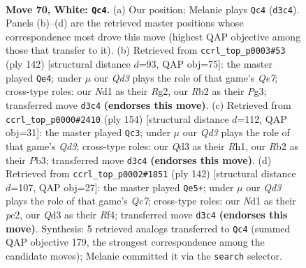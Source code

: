 \documentclass[11pt]{article}
\begin{document}
\clearpage

\begin{figure}[p]\centering
\begin{subfigure}{0.46\textwidth}\centering
\resizebox{\linewidth}{!}{%
\newchessgame
\chessboard[
  setfen={5r2/3qb1k1/5n2/P1p2p2/3p1Pp1/3Q4/1R1BPK2/3N4 w - - 0 70},
  showmover=false,
  pgfstyle=straightmove, color=movearrow, markmove={d3-c4}
]}
\caption{}
\end{subfigure}\hfill
\begin{subfigure}{0.46\textwidth}\centering
\resizebox{\linewidth}{!}{%
\newchessgame
\chessboard[
  setfen={5nk1/4Qpb1/3p2p1/3P3p/p4P2/q3B1PP/6RK/8 w - - 1 72},
  showmover=false,
  pgfstyle=straightmove, color=movearrow, markmove={e7-e4}
]}
\caption{}
\end{subfigure}
\\[4pt]
\begin{subfigure}{0.46\textwidth}\centering
\resizebox{\linewidth}{!}{%
\newchessgame
\chessboard[
  setfen={3q4/2r3k1/3p2pb/p1p1p3/P1B1P3/1P1Q2P1/6K1/7R w - - 8 78},
  showmover=false,
  pgfstyle=straightmove, color=movearrow, markmove={d3-c3}
]}
\caption{}
\end{subfigure}\hfill
\begin{subfigure}{0.46\textwidth}\centering
\resizebox{\linewidth}{!}{%
\newchessgame
\chessboard[
  setfen={6qk/2Q5/1p4pB/p1bb2Pp/P3pR1P/6K1/2p5/8 w - - 2 72},
  showmover=false,
  pgfstyle=straightmove, color=movearrow, markmove={c7-e5}
]}
\caption{}
\end{subfigure}
\caption{\textbf{Move 70, White: \texttt{Qc4}.} (a) Our position; Melanie plays \texttt{Qc4} (\texttt{d3c4}). Panels (b)--(d) are the retrieved master positions whose correspondence most drove this move (highest QAP objective among those that transfer to it). (b) Retrieved from \texttt{ccrl\_top\_p0003\#53} (ply 142) [structural distance $d$=93, QAP obj=75]: the master played \texttt{Qe4}; under $\mu$ our \emph{Qd3} plays the role of that game's \emph{Qe7}; cross-type roles: our \emph{N}d1 as their \emph{R}g2, our \emph{R}b2 as their \emph{P}g3; transferred move \texttt{d3c4} \textbf{(endorses this move)}. (c) Retrieved from \texttt{ccrl\_top\_p0000\#2410} (ply 154) [structural distance $d$=112, QAP obj=31]: the master played \texttt{Qc3}; under $\mu$ our \emph{Qd3} plays the role of that game's \emph{Qd3}; cross-type roles: our \emph{Q}d3 as their \emph{R}h1, our \emph{R}b2 as their \emph{P}b3; transferred move \texttt{d3c4} \textbf{(endorses this move)}. (d) Retrieved from \texttt{ccrl\_top\_p0002\#1851} (ply 142) [structural distance $d$=107, QAP obj=27]: the master played \texttt{Qe5+}; under $\mu$ our \emph{Qd3} plays the role of that game's \emph{Qc7}; cross-type roles: our \emph{N}d1 as their \emph{p}c2, our \emph{Q}d3 as their \emph{R}f4; transferred move \texttt{d3c4} \textbf{(endorses this move)}. Synthesis: 5 retrieved analogs transferred to \texttt{Qc4} (summed QAP objective 179, the strongest correspondence among the candidate moves); Melanie committed it via the \texttt{search} selector.}
\label{fig:thought-m138}
\end{figure}
\end{document}
